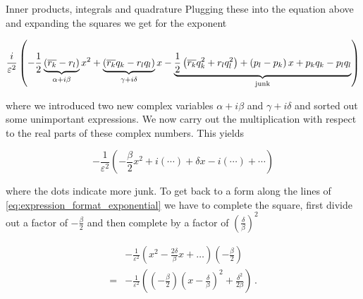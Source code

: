 \begin{chapter}{Inner products, integrals and quadrature}
Plugging these into the equation above and expanding the squares we get for the
exponent

\begin{equation*}
  \frac{i}{\varepsilon^2} \left( - \frac{1}{2}\underbrace{\left(\overline{r_k}-r_l\right)}_{\alpha + i \beta} x^2
                                 + \underbrace{\left(\overline{r_k}q_k-r_l q_l\right)}_{\gamma + i \delta} x
                                 - \underbrace{\frac{1}{2}\left(\overline{r_k}q_k^2 + r_l q_l^2\right)
                                 + \left(p_l-p_k\right) x
                                 + p_k q_k - p_l q_l}_{\text{junk}}
                          \right)
\end{equation*}

where we introduced two new complex variables $\alpha + i \beta$ and $\gamma + i \delta$
and sorted out some unimportant expressions. We now carry out the multiplication
with respect to the real parts of these complex numbers. This yields

\begin{equation}
  -\frac{1}{\varepsilon^2} \left( -\frac{\beta}{2}x^2 + i \left(\cdots\right)
                                  + \delta x -i \left(\cdots\right)
                                  + \cdots
                          \right)
\end{equation}

where the dots indicate more junk. To get back to a form along the lines of
\eqref{eq:expression_format_exponential} we have to complete the square, first
divide out a factor of $-\frac{\beta}{2}$ and then complete by a factor of
$\left(\frac{\delta}{\beta}\right)^2$

\begin{equation}
\begin{split}
    & -\frac{1}{\varepsilon^2} \left( x^2 -\frac{2\delta}{\beta} x + \ldots \right) \left(-\frac{\beta}{2}\right) \\
  = & -\frac{1}{\varepsilon^2} \left( \left(-\frac{\beta}{2}\right) \left(x-\frac{\delta}{\beta}\right)^2 + \frac{\delta^2}{2\beta} \right) \,.
\end{split}
\end{equation}


\end{chapter}
